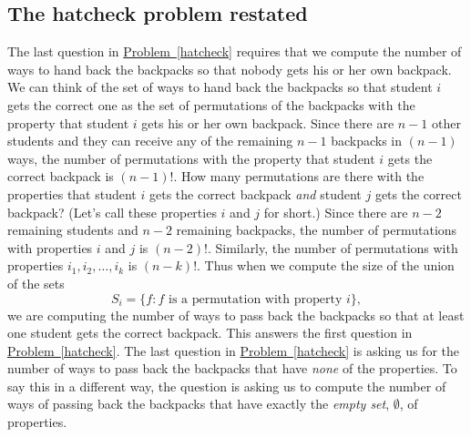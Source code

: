 \documentclass[10pt,]{book}
\theoremstyle{plain}
\theoremstyle{definition}
\numberwithin{equation}{chapter}
\begin{document}
\subsection[{The hatcheck problem restated}]{The hatcheck problem restated}\label{subsection-35}
The last question in \hyperref[hatcheck]{Problem~\ref{hatcheck}} requires that we compute the number of ways to hand back the backpacks so that nobody gets his or her own backpack. We can think of the set of ways to hand back the backpacks so that student \(i\) gets the correct one as the set of permutations of the backpacks with the property that student \(i\) gets his or her own backpack. Since there are \(n-1\) other students and they can receive any of the remaining \(n-1\) backpacks in \((n-1)\) ways, the number of permutations with the property that student \(i\) gets the correct backpack is \((n-1)!\). How many permutations are there with the properties that student \(i\) gets the correct backpack \emph{and} student \(j\) gets the correct backpack? (Let's call these properties \(i\) and \(j\) for short.) Since there are \(n-2\) remaining students and \(n-2\) remaining backpacks, the number of permutations with properties \(i\) and \(j\) is \((n-2)!\). Similarly, the number of permutations with properties \(i_1,i_2,\ldots,i_k\) is \((n-k)!\). Thus when we compute the size of the union of the sets%
\begin{equation*}
S_i=\{f: f\mbox{ is a permutation with property } i\},
\end{equation*}
we are computing the number of ways to pass back the backpacks so that at least one student gets the correct backpack. This answers the first question in \hyperref[hatcheck]{Problem~\ref{hatcheck}}. The last question in \hyperref[hatcheck]{Problem~\ref{hatcheck}} is asking us for the number of ways to pass back the backpacks that have \emph{none} of the properties. To say this in a different way, the question is asking us to compute the number of ways of passing back the backpacks that have exactly the \emph{empty set}, \(\emptyset\), of properties.%
\typeout{************************************************}
\typeout{************************************************}
\end{document}
